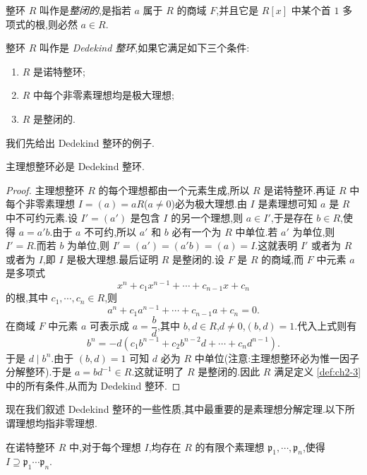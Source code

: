 \begin{definition}\label{def:ch2-2}
整环 $R$ 叫作是\emph{整闭的},是指若 $a$ 属于 $R$ 的商域 $F$,并且它是 $R[x]$ 中某个首 $1$ 多项式的根,则必然 $a\in R$.
\end{definition}

\begin{definition}\label{def:ch2-3}
整环 $R$ 叫作是 \emph{Dedekind 整环},如果它满足如下三个条件:
\begin{enumerate}[(1)]
  \item $R$ 是诺特整环;
  \item $R$ 中每个非零素理想均是极大理想;
  \item $R$ 是整闭的.
\end{enumerate}
\end{definition}

我们先给出 Dedekind 整环的例子.

\begin{lemma}\label{lem:ch2-2}
主理想整环必是 Dedekind 整环.
\end{lemma}

\begin{proof}
主理想整环 $R$ 的每个理想都由一个元素生成,所以 $R$ 是诺特整环.再证 $R$ 中每个非零素理想 $I=(a)=aR$($a\neq 0$)必为极大理想.由 $I$ 是素理想可知 $a$ 是 $R$ 中不可约元素.设 $I'=(a')$ 是包含 $I$ 的另一个理想,则 $a\in I'$,于是存在 $b\in R$,使得 $a=a'b$.由于 $a$ 不可约,所以 $a'$ 和 $b$ 必有一个为 $R$ 中单位.若 $a'$ 为单位,则 $I'=R$.而若 $b$ 为单位,则 $I'=(a')=(a'b)=(a)=I$.这就表明 $I'$ 或者为 $R$ 或者为 $I$,即 $I$ 是极大理想.最后证明 $R$ 是整闭的.设 $F$ 是 $R$ 的商域,而 $F$ 中元素 $a$ 是多项式
\[
  x^n+c_1x^{n-1}+\cdots+c_{n-1}x+c_n
\]
的根,其中 $c_1,\cdots,c_n\in R$,则
\[
  a^n+c_1a^{n-1}+\cdots+c_{n-1}a+c_n=0.
\]
在商域 $F$ 中元素 $a$ 可表示成 $a=\dfrac{b}{d}$,其中 $b,d\in R$,$d\neq 0$,$(b,d)=1$.代入上式则有
\[
  b^n=-d(c_1b^{n-1}+c_2b^{n-2}d+\cdots+c_nd^{n-1}).
\]
于是 $d\mid b^n$.由于 $(b,d)=1$ 可知 $d$ 必为 $R$ 中单位(注意:主理想整环必为惟一因子分解整环).于是 $a=bd^{-1}\in R$.这就证明了 $R$ 是整闭的.因此 $R$ 满足定义 \ref{def:ch2-3} 中的所有条件,从而为 Dedekind 整环.
\end{proof}

现在我们叙述 Dedekind 整环的一些性质,其中最重要的是素理想分解定理.以下所谓理想均指非零理想.

\begin{lemma}\label{lem:ch2-3}
在诺特整环 $R$ 中,对于每个理想 $I$,均存在 $R$ 的有限个素理想 $\mathfrak{p}_1,\cdots,\mathfrak{p}_n$,使得 $I\supseteq\mathfrak{p}_1\cdots\mathfrak{p}_n$.
\end{lemma}

